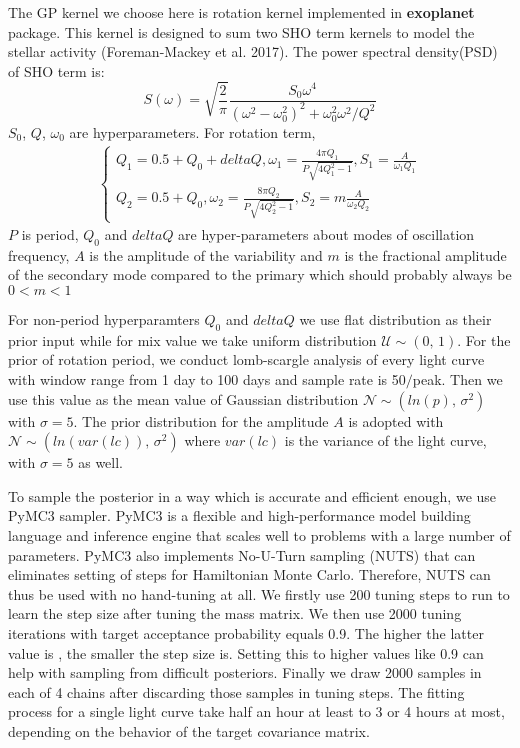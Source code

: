 \documentclass{aastex62}
\begin{document}
The GP kernel we choose here is rotation kernel implemented in \textbf{exoplanet} package. This kernel is designed to sum two SHO term kernels to model the stellar activity (Foreman-Mackey et al. 2017). The power spectral density(PSD) of SHO term is:
\begin{equation}
    S(\omega) = \sqrt{\frac{2}{\pi}} \frac{S_{0}\omega^{4}}{(\omega^{2}-\omega_{0}^{2})^2+\omega_{0}^{2}\omega^{2}/Q^{2}}
\end{equation}
$S_{0}$, $Q$, $\omega_{0}$ are hyperparameters. For rotation term, 
\begin{eqnarray}
    \left\{\begin{array}{ll}
    Q_{1} = 0.5 +Q_{0} + deltaQ, \omega_{1} = \frac{4\pi Q_{1}}{P\sqrt{4Q_{1}^{2}-1}}, S_{1} = \frac{A}{\omega_{1}Q_{1}} \\
    Q_{2} = 0.5 +Q_{0}, \omega_{2} = \frac{8\pi Q_{2}}{P\sqrt{4Q_{2}^{2}-1}}, S_{2} = m \frac{A}{\omega_{2}Q_{2}}
\end{array}\right.
\end{eqnarray}
$P$ is period, $Q_{0}$ and $deltaQ$ are hyper-parameters about modes of oscillation frequency, $A$ is the amplitude of the variability and $m$ is the fractional amplitude of the secondary mode compared to the primary which should probably always be $0<m<1$

For non-period hyperparamters $Q_{0}$ and $deltaQ$ we use flat distribution as their prior input while for mix value we take uniform distribution $\mathcal{U} \sim (0,\,1)$. For the prior of rotation period, we conduct lomb-scargle analysis of every light curve with window range from 1 day to 100 days and sample rate is 50$/$peak. Then we use this value as the mean value of Gaussian distribution $\mathcal{N} \sim (ln(p),\,\sigma^{2})$ with $\sigma=5$. The prior distribution for the amplitude $A$ is adopted with $\mathcal{N} \sim (ln(var(lc)),\,\sigma^{2})$ where $var(lc)$ is the variance of the light curve, with $\sigma=5$ as well.

To sample the posterior in a way which is accurate and efficient enough, we use PyMC3 sampler. PyMC3 is a flexible and high-performance model building language and inference engine that scales well to problems with a large number of parameters. PyMC3 also implements No-U-Turn sampling (NUTS) that can eliminates setting of steps for Hamiltonian Monte Carlo. Therefore, NUTS can thus be used with no hand-tuning at all. We firstly use 200 tuning steps to run to learn the step size after tuning the mass matrix. We then use 2000 tuning iterations with target acceptance probability equals 0.9. The higher the latter value is , the smaller the step size is. Setting this to higher values like 0.9 can help with sampling from difficult posteriors. Finally we draw 2000 samples in each of 4 chains after discarding those samples in tuning steps. The fitting process for a single light curve take half an hour at least to 3 or 4 hours at most, depending on the behavior of the target covariance matrix.
\end{document}
